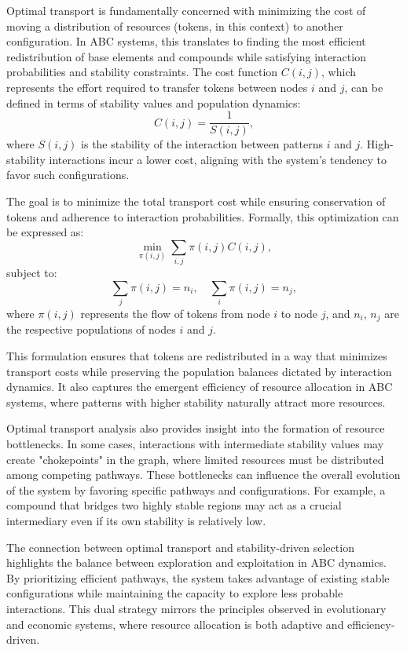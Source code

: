 \documentclass[%
 preprint, linenumbers,
 amsmath,amssymb,
 aps, physrev,
]{revtex4-2}
\begin{document}
Optimal transport is fundamentally concerned with minimizing the cost of moving a distribution of resources (tokens, in this context) to another configuration. In ABC systems, this translates to finding the most efficient redistribution of base elements and compounds while satisfying interaction probabilities and stability constraints. The cost function $C(i, j)$, which represents the effort required to transfer tokens between nodes $i$ and $j$, can be defined in terms of stability values and population dynamics:
\begin{equation}
C(i, j) = \frac{1}{S(i, j)},
\end{equation}
where $S(i, j)$ is the stability of the interaction between patterns $i$ and $j$. High-stability interactions incur a lower cost, aligning with the system’s tendency to favor such configurations.

The goal is to minimize the total transport cost while ensuring conservation of tokens and adherence to interaction probabilities. Formally, this optimization can be expressed as:
\begin{equation}
\min_{\pi(i,j)} \sum_{i,j} \pi(i, j) C(i, j),
\end{equation}
subject to:
\begin{equation}
\sum_j \pi(i, j) = n_i, \quad \sum_i \pi(i, j) = n_j,
\end{equation}
where $\pi(i, j)$ represents the flow of tokens from node $i$ to node $j$, and $n_i$, $n_j$ are the respective populations of nodes $i$ and $j$.

This formulation ensures that tokens are redistributed in a way that minimizes transport costs while preserving the population balances dictated by interaction dynamics. It also captures the emergent efficiency of resource allocation in ABC systems, where patterns with higher stability naturally attract more resources.

Optimal transport analysis also provides insight into the formation of resource bottlenecks. In some cases, interactions with intermediate stability values may create "chokepoints" in the graph, where limited resources must be distributed among competing pathways. These bottlenecks can influence the overall evolution of the system by favoring specific pathways and configurations. For example, a compound that bridges two highly stable regions may act as a crucial intermediary even if its own stability is relatively low.

The connection between optimal transport and stability-driven selection highlights the balance between exploration and exploitation in ABC dynamics. By prioritizing efficient pathways, the system takes advantage of existing stable configurations while maintaining the capacity to explore less probable interactions. This dual strategy mirrors the principles observed in evolutionary and economic systems, where resource allocation is both adaptive and efficiency-driven.
\end{document}
